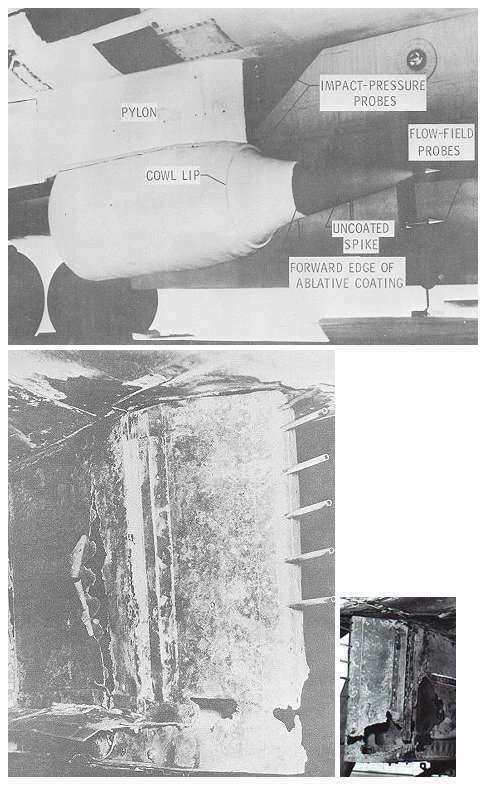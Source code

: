 \documentclass[compress,11pt]{beamer}
\begin{document}
{\begin{center}
    \includegraphics[height=.3\textheight]{figures/x15/x15-ramjet} \hspace{.5em}
    \includegraphics[height=.3\textheight]{figures/x15/x15-pylon} \hspace{.2em}
    \includegraphics[height=.3\textheight]{figures/x15/x15-pylon2}
  \end{center}
}
\end{document}
